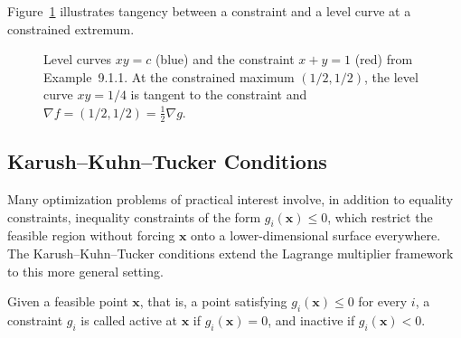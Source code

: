 Figure~\ref{fig:ch11-lagrange} illustrates tangency between a constraint and a level curve at a constrained extremum.

\begin{figure}[!htbp]
\centering
{}
\caption[Lagrange multipliers]{Level curves $xy=c$ (blue) and the constraint
  $x+y=1$ (red) from Example~9.1.1. At the constrained maximum
  $(1/2,1/2)$, the level curve $xy=1/4$ is tangent to the constraint and
  $\nabla f=(1/2,1/2)=\tfrac12\nabla g$.}
\label{fig:ch11-lagrange}
\end{figure}

\subsection{Karush--Kuhn--Tucker Conditions}

Many optimization problems of practical interest involve, in addition to equality constraints, inequality constraints of the form $g_i(\mathbf{x}) \leq 0$, which restrict the feasible region without forcing $\mathbf{x}$ onto a lower-dimensional surface everywhere. The Karush--Kuhn--Tucker conditions extend the Lagrange multiplier framework to this more general setting.

\begin{definition}
Given a feasible point $\mathbf{x}$, that is, a point satisfying $g_i(\mathbf{x}) \leq 0$ for every $i$, a constraint $g_i$ is called active at $\mathbf{x}$ if $g_i(\mathbf{x}) = 0$, and inactive if $g_i(\mathbf{x}) < 0$.
\end{definition}

